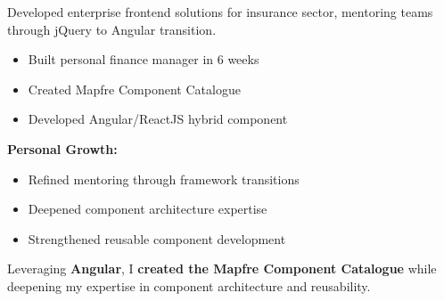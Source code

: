 \documentclass[a4paper,10pt]{article}
\begin{document}
\begin{minipage}{\textwidth}
	Developed enterprise frontend solutions for insurance sector, mentoring teams through jQuery to Angular transition.

	\vspace{0.2cm}
	\begin{itemize}[label=\textcolor{darkblue}{\textbullet}, leftmargin=*, nosep]
		\item Built personal finance manager in 6 weeks
		\item Created Mapfre Component Catalogue
		\item Developed Angular/ReactJS hybrid component
	\end{itemize}

	\vspace{0.2cm}
	\textbf{Personal Growth:}
	\vspace{0.2cm}
	\begin{itemize}[label=\textcolor{darkblue}{\textbullet}, leftmargin=*, nosep]
		\item Refined mentoring through framework transitions
		\item Deepened component architecture expertise
		\item Strengthened reusable component development
	\end{itemize}

    \vspace{0.2cm}

    Leveraging \textbf{Angular}, I \textbf{created the Mapfre Component Catalogue} while deepening my expertise in component architecture and reusability.


\end{minipage}

\nopagebreak
\end{document}
